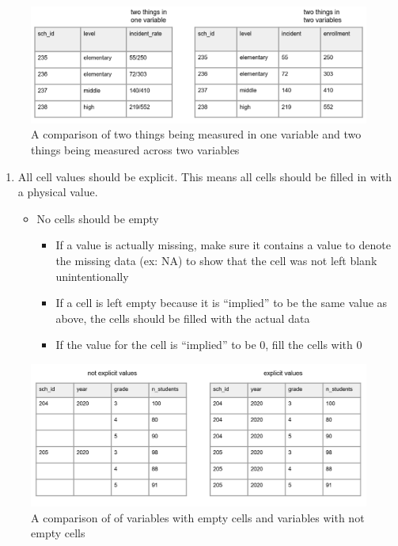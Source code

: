 \documentclass[
]{book}
\providecommand{\tightlist}{%
  \setlength{\itemsep}{0pt}\setlength{\parskip}{0pt}}
\begin{document}
\begin{figure}

{\centering \includegraphics[width=1\linewidth]{img/two_things} 

}

\caption{A comparison of two things being measured in one variable and two things being measured across two variables}\label{fig:unnamed-chunk-5}
\end{figure}

\begin{enumerate}
\def\labelenumi{\arabic{enumi}.}
\setcounter{enumi}{3}
\tightlist
\item
  All cell values should be explicit. This means all cells should be filled in with a physical value.

  \begin{itemize}
  \tightlist
  \item
    No cells should be empty

    \begin{itemize}
    \tightlist
    \item
      If a value is actually missing, make sure it contains a value to denote the missing data (ex: NA) to show that the cell was not left blank unintentionally\\
    \item
      If a cell is left empty because it is ``implied'' to be the same value as above, the cells should be filled with the actual data\\
    \item
      If the value for the cell is ``implied'' to be 0, fill the cells with 0
    \end{itemize}
  \end{itemize}
\end{enumerate}

\begin{figure}

{\centering \includegraphics[width=1\linewidth]{img/explicit} 

}

\caption{A comparison of of variables with empty cells and variables with not empty cells}\label{fig:unnamed-chunk-6}
\end{figure}
\end{document}
